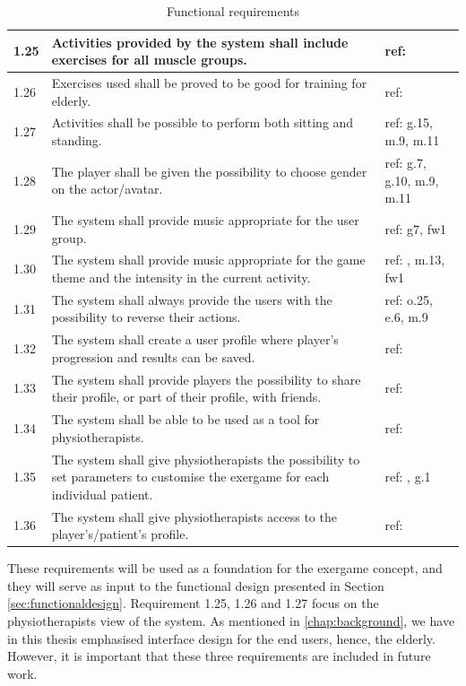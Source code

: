\begin{table} [H]
\centering
\begin{tabular}{|>{\raggedright}p{}|p{}|p{}|}
\hline
1.25 & Activities provided by the system shall include exercises for all muscle groups. & ref: \cite{guidelines} \\ \hline
1.26 & Exercises used shall be proved to be good for training for elderly. & ref: \cite{project} \\ \hline
1.27 & Activities shall be possible to perform both sitting and standing. & ref: g.15, m.9, m.11 \\ \hline
1.28 & The player shall be given the possibility to choose gender on the actor/avatar. & ref: g.7, g.10, m.9, m.11 \\ \hline
1.29 & The system shall provide music appropriate for the user group. & ref: g7, fw1 \\ \hline
1.30 & The system shall provide music appropriate for the game theme and the intensity in the current activity. & ref: \cite{umlapproach}, m.13, fw1 \\ \hline
1.31 & The system shall always provide the users with the possibility to reverse their actions. & ref: o.25, e.6, m.9 \\ \hline
1.32 & The system shall create a user profile where player's progression and results can be saved. & ref: \cite{project} \\ \hline
1.33 & The system shall provide players the possibility to share their profile, or part of their profile, with friends. & ref: \cite{sweetser}\\ \hline
1.34 & The system shall be able to be used as a tool for physiotherapists. & ref: \cite{project}\\ \hline
1.35 & The system shall give physiotherapists the possibility to set parameters to customise the exergame for each individual patient. & ref: \cite{project}, g.1  \\ \hline
1.36 & The system shall give physiotherapists access to the player's/patient's profile. & ref: \cite{project}\\ \hline  
\end{tabular}
\caption[Functional requirements, part 3]{Functional requirements}
\label{tab:func3}
\end{table} 

These requirements will be used as a foundation for the exergame concept, and they will serve as input to the functional design presented in Section \ref{sec:functionaldesign}. Requirement 1.25, 1.26 and 1.27 focus on the physiotherapists view of the system. As mentioned in \ref{chap:background}, we have in this thesis emphasised interface design for the end users, hence, the elderly. However, it is important that these three requirements are included in future work.

